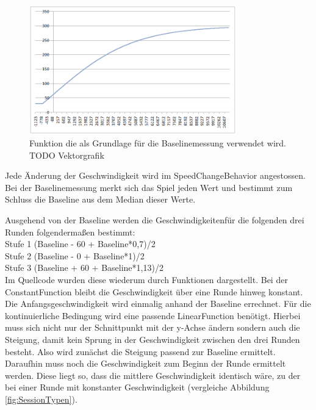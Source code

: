 \documentclass[a4paper,12pt]{scrartcl}
\begin{document}
\begin{figure}[htp]
\begin{center}
  \includegraphics[width=0.8\textwidth]{BaselineFunktion.png}
  \caption[Grundlagenfunktion Baselinemessung]{Funktion die als Grundlage für
  die Baselinemessung verwendet wird.\\ TODO Vektorgrafik}
  \label{fig:BaselineFunktion}
\end{center}
\end{figure} 

Jede Änderung der Geschwindigkeit wird im SpeedChangeBehavior angestossen. Bei der
Baselinemessung merkt sich das Spiel jeden Wert und bestimmt zum Schluss die Baseline
aus dem Median dieser Werte.

Ausgehend von der Baseline werden die Geschwindigkeitenfür die folgenden drei Runden
folgendermaßen bestimmt:\\
Stufe 1 (Baseline - 60 + Baseline*0,7)/2\\
Stufe 2 (Baseline - 0 + Baseline*1)/2\\
Stufe 3 (Baseline + 60 + Baseline*1,13)/2\\

Im Quellcode wurden diese wiederum durch Funktionen dargestellt. Bei der
ConstantFunction bleibt die Geschwindigkeit über eine Runde hinweg konstant.
Die Anfangsgeschwindigkeit wird einmalig anhand der Baseline errechnet. Für die
kontinuierliche Bedingung wird eine passende LinearFunction benötigt. Hierbei muss
sich nicht nur der Schnittpunkt mit der y-Achse ändern sondern auch die Steigung,
damit kein Sprung in der Geschwindigkeit zwischen den drei Runden besteht. Also
wird zunächst die Steigung passend zur Baseline ermittelt. Daraufhin muss noch
die Geschwindigkeit zum Beginn der Runde ermittelt werden. Diese liegt so, dass
die mittlere Geschwindigkeit identisch wäre, zu der bei einer Runde mit konstanter
Geschwindigkeit (vergleiche Abbildung \ref{fig:SessionTypen}).
\end{document}
